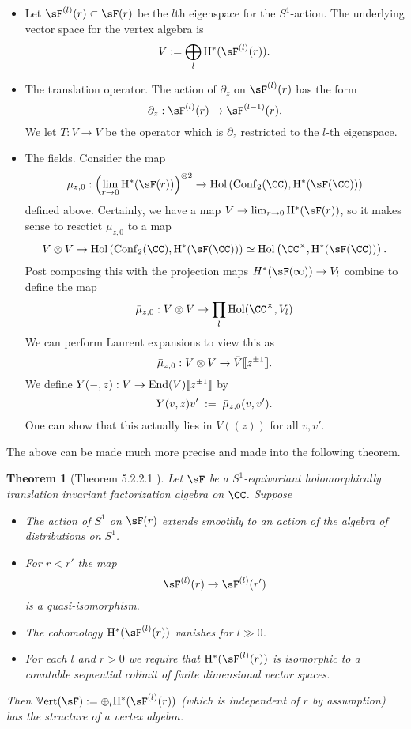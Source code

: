 \documentclass[12pt]{amsart}
\newtheorem{theorem}{Theorem}[section]
\theoremstyle{definition}
\theoremstyle{remark}
\def\tensor{\otimes}
\begin{document}
\begin{itemize}
\item Let $\sF^{(l)}(r) \subset \sF(r)$ be the $l$th eigenspace for the $S^1$-action. The underlying vector
space for the vertex algebra is
\[
V := \bigoplus_l {\rm H}^*(\sF^{(l)}(r)) .
\]
\item The translation operator. The action of $\partial_z$ on $\sF^{(l)}(r)$ has the form
\[
\partial_z : \sF^{(l)}(r) \to 
\sF^{(l-1)}(r) .
\]
We let $T : V \to V$ be the operator which is $\partial_z$ restricted
to the $l$-th eigenspace. 
\item The fields. Consider the map
\[
\mu_{z,0} : \left(\lim_{r \to 0} {\rm
    H}^*(\sF(r))\right)^{\tensor 2} \to {\rm Hol}\left({\rm
  Conf}_2(\CC), {\rm H}^*(\sF(\CC))\right)
\]
defined above. Certainly, we have a map $V
  \to \lim_{r \to 0} {\rm
    H}^*(\sF(r))$, so it makes sense to resctict $\mu_{z,0}$ to a
  map 
\[
V \tensor V \to {\rm Hol}\left({\rm Conf}_2(\CC), {\rm
    H}^*(\sF(\CC))\right) \simeq {\rm Hol}\left(\CC^\times, {\rm
    H}^*(\sF(\CC))\right) .
\]
Post composing this with the projection maps $H^*(\sF(\infty)) \to
V_l$ combine to define the map
\[
\Bar{\mu}_{z,0} : V \tensor V \to \prod_l {\rm Hol}(\CC^\times, V_l)
\]
We can perform Laurent expansions to view this as
\[
\Bar{\mu}_{z,0} : V \tensor V \to \Bar{V} \llbracket z^{\pm 1}
\rrbracket .
\]
We define $Y(-,z) : V \to {\rm End}(V)\llbracket z^{\pm 1}\rrbracket$ by
\[
Y(v,z) v' \; := \; \Bar{\mu}_{z,0}(v,v') .
\]
One can show that this actually lies in $V((z))$ for all $v,v'$. 
\end{itemize}

The above can be made much more precise and made into the following
theorem. 

\begin{theorem}[Theorem 5.2.2.1 \cite{CG1}] \label{fv} Let $\sF$ be a $S^1$-equivariant holomorphically translation invariant factorization algebra on $\CC$. Suppose
\begin{itemize}
\item The action of $S^1$ on $\sF(r)$ extends smoothly to an action of the algebra of distributions on $S^1$. 
\item For $r < r'$ the map 
\[
\sF^{(l)}(r) \to \sF^{(l)}(r')
\]
is a quasi-isomorphism.
\item The cohomology ${\rm H}^*(\sF^{(l)}(r))$ vanishes for $l \gg 0$.
\item For each $l$ and $r > 0$ we require that ${\rm H}^*(\sF^{(l)}(r))$ is isomorphic to a countable sequential colimit of finite dimensional vector spaces. 
\end{itemize}
Then $\mathbb{V}{\rm ert} (\sF) := \oplus_l {\rm H}^*(\sF^{(l)}(r))$ (which is independent of $r$ by assumption) has the structure of a vertex algebra.
\end{theorem}
\end{document}
